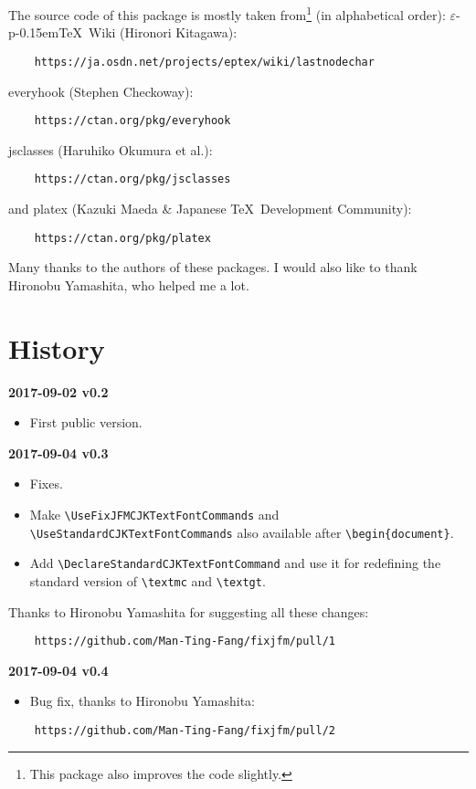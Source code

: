 \documentclass[a4paper]{article}
\newcommand\NormalSans{\normalfont\sffamily}
\newcommand\pkg[1]{{\protect\NormalSans#1}}
\newcommand\pTeX{p\kern-0.15em\TeX}
\newcommand\e{\ensuremath{\varepsilon}}
\newcommand\epTeX{\e-\pTeX}
\newenvironment{history}[1]%
  {\noindent\textbf{#1}\begin{itemize}}%
  {\end{itemize}}
\begin{document}
The source code of this package is mostly taken from\footnote{This package also
improves the code slightly.} (in alphabetical order):
\epTeX\ Wiki (Hironori Kitagawa):
\begin{verbatim}
    https://ja.osdn.net/projects/eptex/wiki/lastnodechar
\end{verbatim}
\pkg{everyhook} (Stephen Checkoway):
\begin{verbatim}
    https://ctan.org/pkg/everyhook
\end{verbatim}
\pkg{jsclasses} (Haruhiko Okumura et al.):
\begin{verbatim}
    https://ctan.org/pkg/jsclasses
\end{verbatim}
and \pkg{platex} (Kazuki Maeda \& Japanese \TeX\ Development Community):
\begin{verbatim}
    https://ctan.org/pkg/platex
\end{verbatim}
Many thanks to the authors of these packages. I would also like to thank
Hironobu Yamashita, who helped me a lot.

\section{History}

\begin{history}{2017-09-02 v0.2}
\item First public version.
\end{history}

\begin{history}{2017-09-04 v0.3}
\item Fixes.
\item Make \verb|\UseFixJFMCJKTextFontCommands| and
  \verb|\UseStandardCJKTextFontCommands| also available after
  \verb|\begin{document}|.
\item Add \verb|\DeclareStandardCJKTextFontCommand| and use it for redefining
  the standard version of \verb|\textmc| and \verb|\textgt|.
\end{history}
Thanks to Hironobu Yamashita for suggesting all these changes:
\begin{verbatim}
    https://github.com/Man-Ting-Fang/fixjfm/pull/1
\end{verbatim}

\begin{history}{2017-09-04 v0.4}
\item Bug fix, thanks to Hironobu Yamashita:
\end{history}
\begin{verbatim}
    https://github.com/Man-Ting-Fang/fixjfm/pull/2
\end{verbatim}
\end{document}
